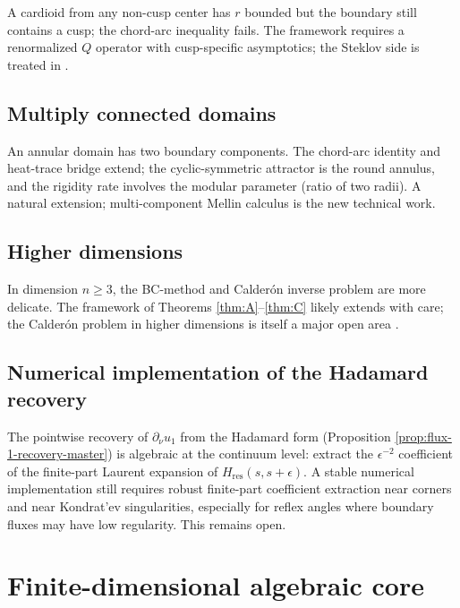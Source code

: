 \documentclass[11pt,reqno]{amsart}
\theoremstyle{plain}
\theoremstyle{definition}
\theoremstyle{remark}
\newcommand{\Qop}{Q}
\begin{document}
A cardioid from any non-cusp center has $r$ bounded but the boundary still contains a cusp; the chord-arc inequality fails. The framework requires a renormalized $\Qop$ operator with cusp-specific asymptotics; the Steklov side is treated in \cite{LPPS-cusps}.

\subsection{Multiply connected domains}\label{ss:annular-open}

An annular domain has two boundary components. The chord-arc identity and heat-trace bridge extend; the cyclic-symmetric attractor is the round annulus, and the rigidity rate involves the modular parameter (ratio of two radii). A natural extension; multi-component Mellin calculus is the new technical work.

\subsection{Higher dimensions}\label{ss:higher-dims-open}

In dimension $n \geq 3$, the BC-method and Calderón inverse problem are more delicate. The framework of Theorems \ref{thm:A}--\ref{thm:C} likely extends with care; the Calderón problem in higher dimensions is itself a major open area \cite{KSU2007}.

\subsection{Numerical implementation of the Hadamard recovery}\label{ss:numerics-open}

The pointwise recovery of $\partial_\nu u_1$ from the Hadamard form (Proposition \ref{prop:flux-1-recovery-master}) is algebraic at the continuum level: extract the $\epsilon^{-2}$ coefficient of the finite-part Laurent expansion of $H_{\mathrm{res}}(s,s+\epsilon)$. A stable numerical implementation still requires robust finite-part coefficient extraction near corners and near Kondrat'ev singularities, especially for reflex angles where boundary fluxes may have low regularity. This remains open.

\appendix

\section{Finite-dimensional algebraic core}\label{app:algebraic-core}
\end{document}

